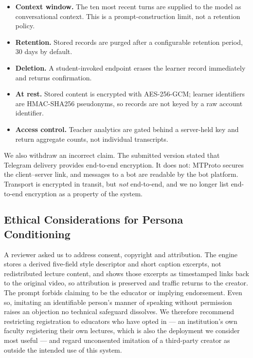 \documentclass[conference]{IEEEtran}
\begin{document}
\begin{itemize}
\item \textbf{Context window.} The ten most recent turns are supplied to the
model as conversational context. This is a prompt-construction limit, not a
retention policy.
\item \textbf{Retention.} Stored records are purged after a configurable
retention period, $30$ days by default.
\item \textbf{Deletion.} A student-invoked endpoint erases the learner record
immediately and returns confirmation.
\item \textbf{At rest.} Stored content is encrypted with AES-256-GCM; learner
identifiers are HMAC-SHA256 pseudonyms, so records are not keyed by a raw
account identifier.
\item \textbf{Access control.} Teacher analytics are gated behind a server-held
key and return aggregate counts, not individual transcripts.
\end{itemize}

We also withdraw an incorrect claim. The submitted version stated that Telegram
delivery provides end-to-end encryption. It does not: MTProto secures the
client--server link, and messages to a bot are readable by the bot platform.
Transport is encrypted in transit, but \emph{not} end-to-end, and we no longer
list end-to-end encryption as a property of the system.

\subsection{Ethical Considerations for Persona Conditioning}
\label{sec:ethics}
A reviewer asked us to address consent, copyright and attribution. The engine
stores a derived five-field style descriptor and short caption excerpts, not
redistributed lecture content, and shows those excerpts as timestamped links
back to the original video, so attribution is preserved and traffic returns to
the creator. The prompt forbids claiming to be the educator or implying
endorsement. Even so, imitating an identifiable person's manner of speaking
without permission raises an objection no technical safeguard dissolves. We
therefore recommend restricting registration to educators who have opted in ---
an institution's own faculty registering their own lectures, which is also the
deployment we consider most useful --- and regard unconsented imitation of a
third-party creator as outside the intended use of this system.

\end{document}
